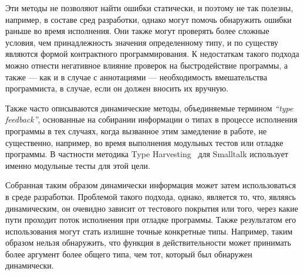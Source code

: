 Эти методы не позволяют найти ошибки статически, и поэтому не так полезны,
например, в составе сред разработки, однако могут помочь обнаружить ошибки
раньше во время исполнения.  Они также могут проверять более сложные условия,
чем принадлежность значения определенному типу, и по существу являются формой
контрактного программирования.  К недостаткам такого подхода можно отнести
негативное влияние проверок на быстродействие программы, а также --- как и
в случае с аннотациями --- необходимость вмешательства программиста, в случае,
если он должен вносить их вручную.

Также часто описываются динамические методы, объединяемые термином \emph{``type
  feedback''}, основанные на собирании информации о типах в процессе исполнения
программы в тех случаях, когда вызванное этим замедление в работе, не
существенно, например, во время выполнения модульных тестов или отладке
программы. В частности методика Type Harvesting~\cite{Haupt2011}
для Smalltalk использует именно модульные тесты для этой цели.

Собранная таким образом динамически информация может затем использоваться в
среде разработки.  Проблемой такого подхода, однако, является то, что, являясь
динамическим, он очевидно зависит от тестового покрытия или того, через какие пути
проходит поток исполнения при отладке программы. Также результатом его
использования могут стать излишне точные конкретные типы. Например, таким
образом нельзя обнаружить, что функция в действительности может принимать более
аргумент более общего типа, чем тот, который был обнаружен динамически.
